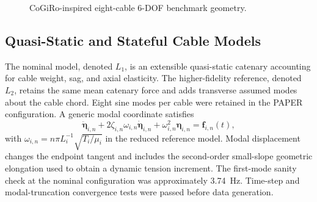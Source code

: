 \documentclass[conference]{IEEEtran}
\begin{document}
\begin{figure}[t]
\centering
{}
\caption{CoGiRo-inspired eight-cable 6-DOF benchmark geometry.}
\label{fig:geometry}
\end{figure}

\subsection{Quasi-Static and Stateful Cable Models}
The nominal model, denoted $L_1$, is an extensible quasi-static catenary accounting for cable weight, sag, and axial elasticity. The higher-fidelity reference, denoted $L_2$, retains the same mean catenary force and adds transverse assumed modes about the cable chord. Eight sine modes per cable were retained in the PAPER configuration. A generic modal coordinate satisfies
\begin{equation}
\ddot{\boldsymbol\eta}_{i,n}+2\zeta_{i,n}\omega_{i,n}\dot{\boldsymbol\eta}_{i,n}
+\omega_{i,n}^2\boldsymbol\eta_{i,n}=\mathbf f_{i,n}(t),
\end{equation}
with $\omega_{i,n}=n\pi L_i^{-1}\sqrt{T_i/\mu_i}$ in the reduced reference model. Modal displacement changes the endpoint tangent and includes the second-order small-slope geometric elongation used to obtain a dynamic tension increment. The first-mode sanity check at the nominal configuration was approximately \SI{3.74}{Hz}. Time-step and modal-truncation convergence tests were passed before data generation.
\end{document}
